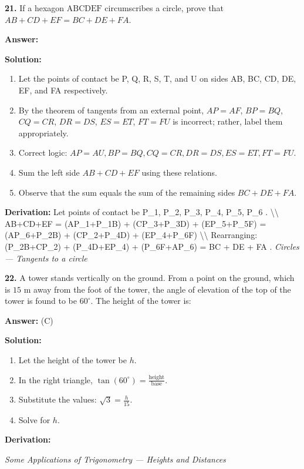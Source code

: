 \documentclass[12pt,a4paper]{exam}
\newcommand{\fitmath}[1]{%
  \sbox{\schmathbox}{$\displaystyle #1$}%
  \ifdim\wd\schmathbox>\linewidth
    \resizebox{\linewidth}{!}{\usebox{\schmathbox}}%
  \else
    \usebox{\schmathbox}%
  \fi}
\begin{document}
\begin{questions}
\question \textbf{21.} If a hexagon $\text{ABCDEF}$ circumscribes a circle, prove that $AB + CD + EF = BC + DE + FA$.

\textbf{Answer:}
\begin{center}
\fitmath{AB + CD + EF = BC + DE + FA}
\end{center}

\textbf{Solution:}
\begin{enumerate}
  \item Let the points of contact be P, Q, R, S, T, and U on sides AB, BC, CD, DE, EF, and FA respectively.
  \item By the theorem of tangents from an external point, $AP=AF$, $BP=BQ$, $CQ=CR$, $DR=DS$, $ES=ET$, $FT=FU$ is incorrect; rather, label them appropriately.
  \item Correct logic: $AP=AU, BP=BQ, CQ=CR, DR=DS, ES=ET, FT=FU$.
  \item Sum the left side $AB + CD + EF$ using these relations.
  \item Observe that the sum equals the sum of the remaining sides $BC + DE + FA$.
\end{enumerate}
\textbf{Derivation:}
Let points of contact be  P\_1, P\_2, P\_3, P\_4, P\_5, P\_6 . \textbackslash{}\textbackslash{}  AB+CD+EF = (AP\_1+P\_1B) + (CP\_3+P\_3D) + (EP\_5+P\_5F) = (AP\_6+P\_2B) + (CP\_2+P\_4D) + (EP\_4+P\_6F) \textbackslash{}\textbackslash{} Rearranging: (P\_2B+CP\_2) + (P\_4D+EP\_4) + (P\_6F+AP\_6) = BC + DE + FA .
\hfill \textit{Circles — Tangents to a circle}
\vspace{0.3cm}

\question \textbf{22.} A tower stands vertically on the ground. From a point on the ground, which is $15$ m away from the foot of the tower, the angle of elevation of the top of the tower is found to be $60^\circ$. The height of the tower is:

\textbf{Answer:}
(C)

\textbf{Solution:}
\begin{enumerate}
  \item Let the height of the tower be $h$.
  \item In the right triangle, $\tan(60^\circ) = \frac{\text{height}}{\text{base}}$.
  \item Substitute the values: $\sqrt{3} = \frac{h}{15}$.
  \item Solve for $h$.
\end{enumerate}
\textbf{Derivation:}
\begin{center}
\fitmath{\begin{aligned}
\tan(60^\circ) = \frac{h}{15} \\
\implies \sqrt{3} = \frac{h}{15} \\
\implies h = 15\sqrt{3} \text{ m}
\end{aligned}}
\end{center}
\hfill \textit{Some Applications of Trigonometry — Heights and Distances}
\vspace{0.3cm}


\end{questions}
\end{document}
